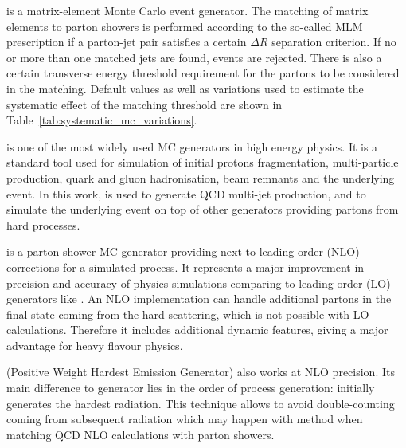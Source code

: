 \begin{description}[wide=\parindent, style=standard, labelsep=0pt]
\item [\MADGRAPH] \autocite{MadGraph} is a matrix-element Monte Carlo event generator. The matching of matrix elements
to parton showers is performed according to the so-called MLM prescription \autocite{MLM} if a parton-jet pair satisfies
a certain $\Delta R$ separation criterion. If no or more than one matched jets are found, events are rejected. There is
also a certain transverse energy threshold requirement for the partons to be considered in the matching. Default values
as well as variations used to estimate the systematic effect of the matching threshold are shown in
Table~\ref{tab:systematic_mc_variations}.

\item [\PYTHIA] \autocite{Pythia,Pythia6.4} is one of the most widely used MC generators in high energy physics. It is a
standard tool used for simulation of initial protons fragmentation, multi-particle production, quark and gluon
hadronisation, beam remnants and the underlying event. In this work, \PYTHIA is used to generate QCD multi-jet
production, and to simulate the underlying event on top of other generators providing partons from hard processes.

\item [\MCATNLO] \autocite{MCatNLO} is a parton shower MC generator providing next-to-leading order (NLO) corrections
for a simulated process. It represents a major improvement in precision and accuracy of physics simulations comparing to
leading order (LO) generators like \PYTHIA. An NLO implementation can handle additional partons in the final state
coming from the hard scattering, which is not possible with LO calculations. Therefore it includes additional dynamic
features, giving a major advantage for heavy flavour physics.

\item [\POWHEG] (Positive Weight Hardest Emission Generator) \autocite{POWHEG} also works at NLO precision. Its main
difference to \MCATNLO generator lies in the order of process generation: \POWHEG initially generates the hardest
radiation. This technique allows to avoid double-counting coming from subsequent radiation which may happen with
\MCATNLO method when matching QCD NLO calculations with parton showers.

\end{description}

